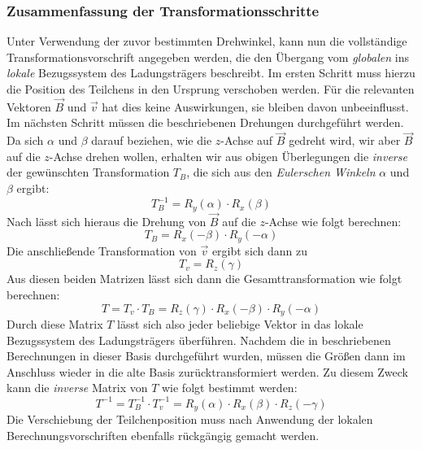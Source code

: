 \subsubsection{Zusammenfassung der Transformationsschritte}
Unter Verwendung der zuvor bestimmten Drehwinkel, kann nun die vollst\"andige Transformationsvorschrift angegeben
werden, die den \"Ubergang vom \textit{globalen} ins \textit{lokale} Bezugssystem des Ladungstr\"agers beschreibt. Im ersten Schritt
muss hierzu die Position des Teilchens in den Ursprung verschoben werden. F\"ur die relevanten Vektoren \(\vec{B}\) und \(\vec{v}\)
hat dies keine Auswirkungen, sie bleiben davon unbeeinflusst. Im n\"achsten Schritt m\"ussen die beschriebenen Drehungen
durchgef\"uhrt werden. Da sich \(\alpha\) und \(\beta\) darauf beziehen, wie die \(z\)-Achse auf \(\vec{B}\) gedreht wird, wir aber
\(\vec{B}\) auf die \(z\)-Achse drehen wollen, erhalten wir aus obigen \"Uberlegungen die \textit{inverse} der gew\"unschten
Transformation \(T_B\), die sich aus den \textit{Eulerschen Winkeln} \(\alpha\) und \(\beta\) ergibt:
\begin{equation}
  T_B^{-1} = R_y(\alpha) \cdot R_x(\beta)
\end{equation}
Nach  l\"asst sich hieraus die Drehung von \(\vec{B}\) auf die \(z\)-Achse wie folgt berechnen:
\begin{equation}
  T_B = R_x(-\beta) \cdot R_y(-\alpha)
\end{equation}
Die anschlie{\ss}ende Transformation von \(\vec{v}\) ergibt sich dann zu
\begin{equation}
  T_v = R_z(\gamma)
\end{equation}
Aus diesen beiden Matrizen l\"asst sich dann die Gesamttransformation wie folgt berechnen:
\begin{equation}
  T = T_v \cdot T_B = R_z(\gamma) \cdot R_x(-\beta) \cdot R_y(-\alpha)
\end{equation}
Durch diese Matrix \(T\) l\"asst sich also jeder beliebige Vektor in das lokale Bezugssystem des Ladungstr\"agers \"uberf\"uhren.
Nachdem die in  beschriebenen Berechnungen in dieser Basis durchgef\"uhrt wurden,
m\"ussen die Gr\"o{\ss}en dann im
Anschluss wieder in die alte Basis zur\"ucktransformiert werden. Zu diesem Zweck kann die \textit{inverse} Matrix von \(T\)
wie folgt bestimmt werden:
\begin{equation}
  T^{-1} = T_B^{-1} \cdot T_v^{-1} = R_y(\alpha) \cdot R_x(\beta) \cdot R_z(-\gamma)
\end{equation}
Die Verschiebung der Teilchenposition muss nach Anwendung der lokalen Berechnungsvorschriften ebenfalls r\"uckg\"angig gemacht werden.

